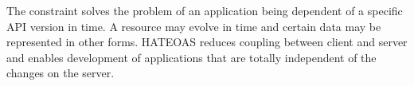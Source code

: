 The constraint solves the problem of an application being dependent of a specific API version in time. A resource may evolve in time and certain data may be represented in other forms. HATEOAS reduces coupling between client and server and enables development of applications that are totally independent of the changes on the server.